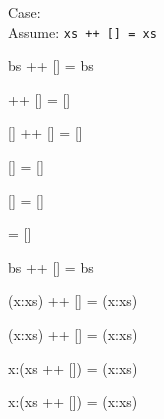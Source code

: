 \documentclass{beamer}
\newcommand{\ca}[1]{{\color{blue}#1}}
\newcommand{\cb}[1]{{\color{violet}#1}}
\newcommand{\cc}[1]{{\color{red}#1}}
\newcommand{\ce}[1]{{\color{green!50!black}#1}}
\begin{document}
\begin{frame}[t,fragile]
\begin{overprint}
Case:\quad{\ce{\Verb?bs = (x:xs)?}} \checkmark \\
Assume: \Verb?xs ++ [] = xs?

\end{overprint}

\vspace{5pt}

\begin{center}
\begin{overprint}

\begin{semiverbatim}
\alert<4>{bs} ++ [] = \alert<4>{bs}
\end{semiverbatim}

\begin{semiverbatim}
[] ++ [] = []
\end{semiverbatim}

\begin{semiverbatim}
\ca{[]} ++ \cb{[]} = []
\end{semiverbatim}

\begin{semiverbatim}
      \cb{[]} = []
\end{semiverbatim}

\begin{semiverbatim}
      \alert{[]} = \alert{[]}
\end{semiverbatim}

\begin{semiverbatim}
      [] = []
\end{semiverbatim}

\begin{semiverbatim}
\alert<14>{bs}     ++ [] = \alert<14>{bs}
\end{semiverbatim}

\begin{semiverbatim}
(x:xs) ++ [] = (x:xs)
\end{semiverbatim}

\begin{semiverbatim}
(\ca{x}:\cb{xs}) ++ \cc{[]} = (x:xs)
\end{semiverbatim}

\begin{semiverbatim}
\ca{x}:(\cb{xs} ++ \cc{[]}) = (x:xs)
\end{semiverbatim}

\begin{semiverbatim}
x:(\alert{xs ++ []}) = (x:xs)
\end{semiverbatim}


\end{overprint}
\end{center}
\end{frame}
\end{document}
